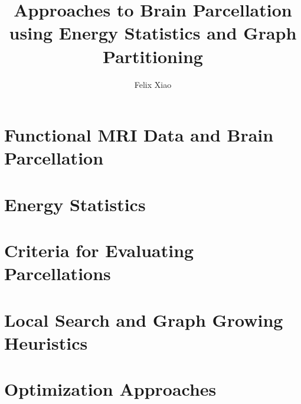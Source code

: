 \documentclass{report}
\title{Approaches to Brain Parcellation using Energy Statistics and Graph Partitioning}
\author{Felix Xiao}
\begin{document}
\maketitle
\tableofcontents

\chapter{Functional MRI Data and Brain Parcellation}


\chapter{Energy Statistics}


\chapter{Criteria for Evaluating Parcellations}


\chapter{Local Search and Graph Growing Heuristics}


\chapter{Optimization Approaches}

\end{document}
